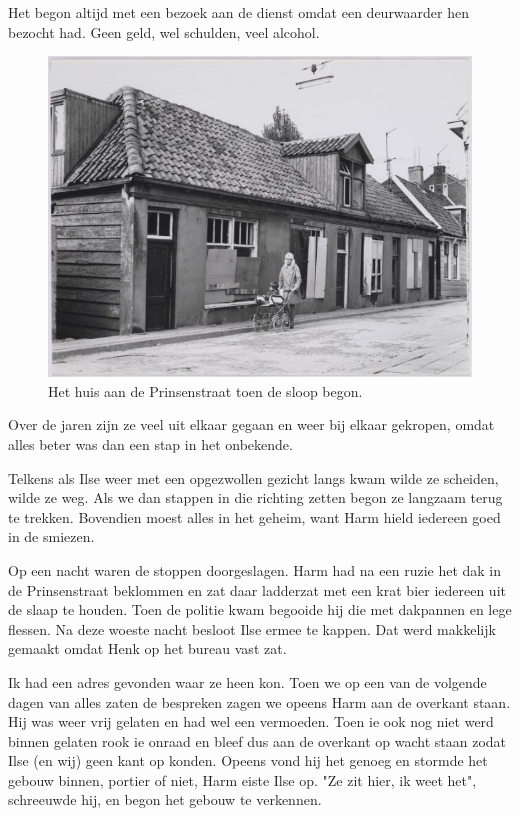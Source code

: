 \documentclass[12pt,twoside, openright]{memoir}
\begin{document}
Het begon altijd met een bezoek aan de dienst omdat een deurwaarder hen bezocht had. Geen geld, wel schulden, veel alcohol.

\begin{figure}
\centering
\includegraphics[width=\textwidth]{img/263pstraat}
\caption*{\footnotesize Het huis aan de Prinsenstraat toen de sloop begon.}
\end{figure}

Over de jaren zijn ze veel uit elkaar gegaan en weer bij elkaar gekropen, omdat alles beter was dan een stap in het onbekende. 

Telkens als Ilse weer met een opgezwollen gezicht langs kwam wilde ze scheiden, wilde ze weg. Als we dan stappen in die richting zetten begon ze langzaam terug te trekken. Bovendien moest alles in het geheim, want Harm hield iedereen goed in de smiezen. 

Op een nacht waren de stoppen doorgeslagen. Harm had na een ruzie het dak in de Prinsenstraat beklommen en zat daar ladderzat met een krat bier iedereen uit de slaap te houden. Toen de politie kwam begooide hij die met dakpannen en lege flessen. Na deze woeste nacht besloot Ilse ermee te kappen. Dat werd makkelijk gemaakt omdat Henk op het bureau vast zat. 

Ik had een adres gevonden waar ze heen kon. Toen we op een van de volgende dagen van alles zaten de bespreken zagen we opeens Harm aan de overkant staan. Hij was weer vrij gelaten en had wel een vermoeden. Toen ie ook nog niet werd binnen gelaten rook ie onraad en bleef dus aan de overkant op wacht staan zodat Ilse (en wij) geen kant op konden. Opeens vond hij het genoeg en stormde het gebouw binnen, portier of niet, Harm eiste Ilse op. "Ze zit hier, ik weet het", schreeuwde hij, en begon het gebouw te verkennen. 
\end{document}
